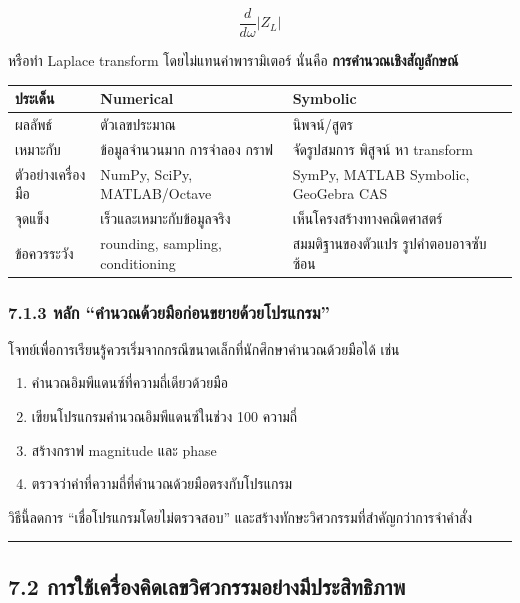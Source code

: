\[
\frac{d}{d\omega}|Z_L|
\]

หรือทำ Laplace transform โดยไม่แทนค่าพารามิเตอร์ นั่นคือ \textbf{การคำนวณเชิงสัญลักษณ์}

\begin{table}[htbp]
    \centering
    \begin{tabular}{l l l}
        \hline
        \textbf{ประเด็น} & \textbf{Numerical} & \textbf{Symbolic} \\
        \hline
        ผลลัพธ์ & ตัวเลขประมาณ & นิพจน์/สูตร \\
        เหมาะกับ & ข้อมูลจำนวนมาก การจำลอง กราฟ & จัดรูปสมการ พิสูจน์ หา transform \\
        ตัวอย่างเครื่องมือ & NumPy, SciPy, MATLAB/Octave & SymPy, MATLAB Symbolic, GeoGebra CAS \\
        จุดแข็ง & เร็วและเหมาะกับข้อมูลจริง & เห็นโครงสร้างทางคณิตศาสตร์ \\
        ข้อควรระวัง & rounding, sampling, conditioning & สมมติฐานของตัวแปร รูปคำตอบอาจซับซ้อน \\
        \hline
    \end{tabular}
\end{table}

\subsubsection{7.1.3 หลัก “คำนวณด้วยมือก่อนขยายด้วยโปรแกรม”}

โจทย์เพื่อการเรียนรู้ควรเริ่มจากกรณีขนาดเล็กที่นักศึกษาคำนวณด้วยมือได้ เช่น

\begin{enumerate}
    \item คำนวณอิมพีแดนซ์ที่ความถี่เดียวด้วยมือ
    \item เขียนโปรแกรมคำนวณอิมพีแดนซ์ในช่วง 100 ความถี่
    \item สร้างกราฟ magnitude และ phase
    \item ตรวจว่าค่าที่ความถี่ที่คำนวณด้วยมือตรงกับโปรแกรม
\end{enumerate}

วิธีนี้ลดการ “เชื่อโปรแกรมโดยไม่ตรวจสอบ” และสร้างทักษะวิศวกรรมที่สำคัญกว่าการจำคำสั่ง

\par\noindent\rule{\textwidth}{0.4pt}\par

\subsection{7.2 การใช้เครื่องคิดเลขวิศวกรรมอย่างมีประสิทธิภาพ}

